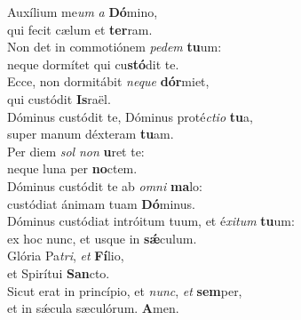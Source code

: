 \evenverse Auxílium me\textit{um} \textit{a} \textbf{Dó}mino,~\*\\
\evenverse qui fecit cælum et \textbf{ter}ram.\\
\oddverse Non det in commotiónem \textit{pe}\textit{dem} \textbf{tu}um:~\*\\
\oddverse neque dormítet qui cu\textbf{stó}dit te.\\
\evenverse Ecce, non dormitábit \textit{ne}\textit{que} \textbf{dór}miet,~\*\\
\evenverse qui custódit \textbf{Is}raël.\\
\oddverse Dóminus custódit te, Dóminus proté\textit{cti}\textit{o} \textbf{tu}a,~\*\\
\oddverse super manum déxteram \textbf{tu}am.\\
\evenverse Per diem \textit{sol} \textit{non} \textbf{u}ret te:~\*\\
\evenverse neque luna per \textbf{no}ctem.\\
\oddverse Dóminus custódit te ab \textit{om}\textit{ni} \textbf{ma}lo:~\*\\
\oddverse custódiat ánimam tuam \textbf{Dó}minus.\\
\evenverse Dóminus custódiat intróitum tuum, et é\textit{xi}\textit{tum} \textbf{tu}um:~\*\\
\evenverse ex hoc nunc, et usque in \textbf{sǽ}culum.\\
\oddverse Glória Pa\textit{tri}, \textit{et} \textbf{Fí}lio,~\*\\
\oddverse et Spirítui \textbf{San}cto.\\
\evenverse Sicut erat in princípio, et \textit{nunc}, \textit{et} \textbf{sem}per,~\*\\
\evenverse et in sǽcula sæculórum. \textbf{A}men.\\
